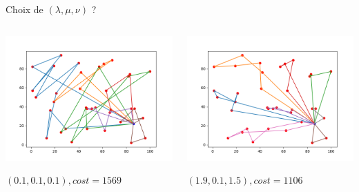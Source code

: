 \documentclass{beamer}
\begin{document}
\begin{frame}{Choix de $(\lambda,\mu,\nu)$ ?}

 \begin{columns}[t]
  \begin{column}{4cm}
  	\centering
	\includegraphics[scale=0.27]{resCW111.png}
	
	$(0.1,0.1,0.1), cost = 1569$
  \end{column}
  
  \begin{column}{4cm}
  	\centering
	\includegraphics[scale=0.27]{resCW190105.png}
 
 	$(1.9,0.1,1.5), cost = 1106$
  \end{column}


\end{columns}
\end{frame}
\end{document}
